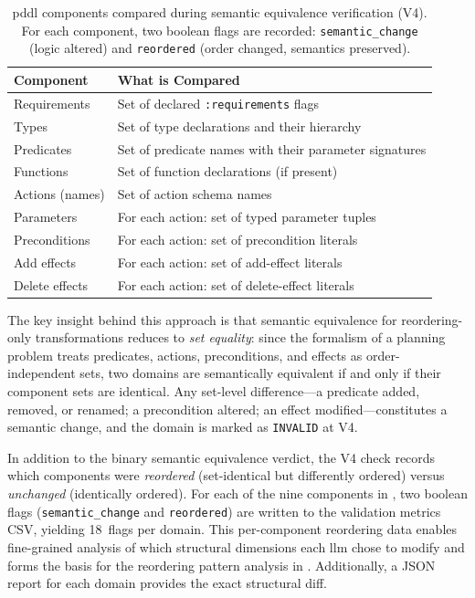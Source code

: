 \begin{table}[htbp]
  \centering
  \caption{\gls{pddl} components compared during semantic equivalence verification (V4). For each component, two boolean flags are recorded: \texttt{semantic\_change} (logic altered) and \texttt{reordered} (order changed, semantics preserved).}
  \label{tab:v4_components}
  \small
  \begin{tabular}{l p{8.5cm}}
    \toprule
    \textbf{Component} & \textbf{What is Compared} \\
    \midrule
    Requirements & Set of declared \texttt{:requirements} flags \\
    Types & Set of type declarations and their hierarchy \\
    Predicates & Set of predicate names with their parameter signatures \\
    Functions & Set of function declarations (if present) \\
    Actions (names) & Set of action schema names \\
    Parameters & For each action: set of typed parameter tuples \\
    Preconditions & For each action: set of precondition literals \\
    Add effects & For each action: set of add-effect literals \\
    Delete effects & For each action: set of delete-effect literals \\
    \bottomrule
  \end{tabular}
\end{table}

The key insight behind this approach is that semantic equivalence for reordering-only transformations reduces to \emph{set equality}: since the formalism of a planning problem treats predicates, actions, preconditions, and effects as order-independent sets, two domains are semantically equivalent if and only if their component sets are identical.
Any set-level difference---a predicate added, removed, or renamed; a precondition altered; an effect modified---constitutes a semantic change, and the domain is marked as \texttt{INVALID} at V4.

In addition to the binary semantic equivalence verdict, the V4 check records which components were \emph{reordered} (set-identical but differently ordered) versus \emph{unchanged} (identically ordered).
For each of the nine components in , two boolean flags (\texttt{semantic\_change} and \texttt{reordered}) are written to the validation metrics CSV, yielding 18~flags per domain.
This per-component reordering data enables fine-grained analysis of which structural dimensions each \gls{llm} chose to modify and forms the basis for the reordering pattern analysis in .
Additionally, a JSON report for each domain provides the exact structural diff.

